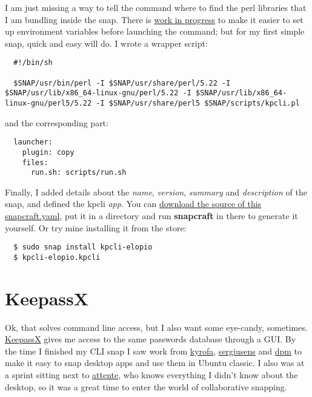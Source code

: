 \documentclass[12pt]{article}
\begin{document}
I am just missing a way to tell the command where to find the perl libraries
that I am bundling inside the snap. There is
\href{https://bugs.launchpad.net/snapcraft/+bug/1583259}{work in progress} to
make it easier to set up environment variables before launching the command;
but for my first simple snap, quick and easy will do. I wrote a wrapper script:

\begin{verbatim}
  #!/bin/sh

  $SNAP/usr/bin/perl -I $SNAP/usr/share/perl/5.22 -I $SNAP/usr/lib/x86_64-linux-gnu/perl/5.22 -I $SNAP/usr/lib/x86_64-linux-gnu/perl5/5.22 -I $SNAP/usr/share/perl5 $SNAP/scripts/kpcli.pl
\end{verbatim}

and the corresponding part:

\begin{verbatim}
  launcher:
    plugin: copy
    files:
      run.sh: scripts/run.sh
\end{verbatim}

Finally, I added details about the \emph{name}, \emph{version}, \emph{summary}
and \emph{description} of the snap, and defined the kpcli \emph{app}. You can
\href{https://github.com/ubuntu/snappy-playpen/blob/master/kpcli/snapcraft.yaml}
{download the source of this snapcraft.yaml}, put it in a directory and run
\textbf{snapcraft} in there to generate it yourself. Or try mine installing it
from the store:

\begin{verbatim}
  $ sudo snap install kpcli-elopio
  $ kpcli-elopio.kpcli
\end{verbatim}

\section{KeepassX}

Ok, that solves command line access, but I also want some eye-candy, sometimes.
\href{https://github.com/keepassx/keepassx.git}{KeepassX} gives me access to
the same passwords database through a GUI. By the time I finished my CLI snap I
saw work from \href{https://kyrofa.com/}{kyrofa},
\href{http://blog.sergiusens.org}{sergiusens} and
\href{http://davidplanella.org/}{dpm} to make it easy to snap desktop apps and
use them in Ubuntu classic. I also was at a sprint sitting next to
\href{https://launchpad.net/~attente}{attente}, who knows everything I didn't
know about the desktop, so it was a great time to enter the world of
collaborative snapping.
\end{document}
